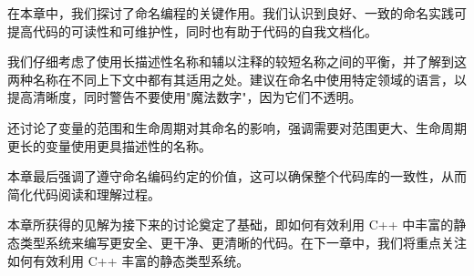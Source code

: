 在本章中，我们探讨了命名编程的关键作用。我们认识到良好、一致的命名实践可提高代码的可读性和可维护性，同时也有助于代码的自我文档化。

我们仔细考虑了使用长描述性名称和辅以注释的较短名称之间的平衡，并了解到这两种名称在不同上下文中都有其适用之处。建议在命名中使用特定领域的语言，以提高清晰度，同时警告不要使用"魔法数字"，因为它们不透明。

还讨论了变量的范围和生命周期对其命名的影响，强调需要对范围更大、生命周期更长的变量使用更具描述性的名称。

本章最后强调了遵守命名编码约定的价值，这可以确保整个代码库的一致性，从而简化代码阅读和理解过程。

本章所获得的见解为接下来的讨论奠定了基础，即如何有效利用 C++ 中丰富的静态类型系统来编写更安全、更干净、更清晰的代码。在下一章中，我们将重点关注如何有效利用 C++ 丰富的静态类型系统。













